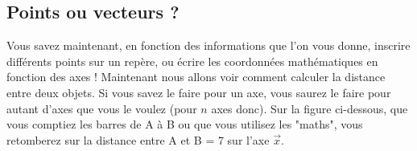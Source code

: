 \documentclass[
	11pt, %
	fleqn, %
	a4paper, %
]{LegrandOrangeBook}
\begin{document}
\subsection{Points ou vecteurs ?}
Vous savez maintenant, en fonction des informations que l'on vous donne, inscrire différents points sur un repère, ou écrire les coordonnées mathématiques en fonction des axes ! Maintenant nous allons voir comment calculer la distance entre deux objets. Si vous savez le faire pour un axe, vous saurez le faire pour autant d'axes que vous le voulez (pour $n$ axes donc). Sur la figure ci-dessous, que vous comptiez les barres de A à B ou que vous utilisez les "maths", vous retomberez sur la distance entre A et B = 7 sur l'axe $\vec{x}$.



\end{document}
